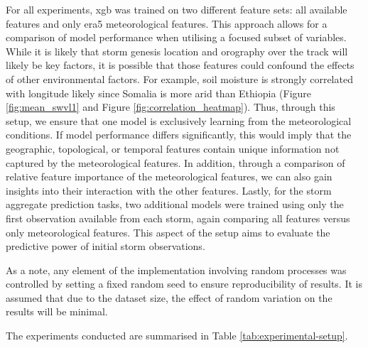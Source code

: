 For all experiments, \acrshort{xgb} was trained on two different feature sets: all available features and only \acrshort{era5} meteorological features. This approach allows for a comparison of model performance when utilising a focused subset of variables. While it is likely that storm genesis location and orography over the track will likely be key factors, it is possible that those features could confound the effects of other environmental factors. For example, soil moisture is strongly correlated with longitude likely since Somalia is more arid than Ethiopia (Figure \ref{fig:mean_swvl1} and Figure \ref{fig:correlation_heatmap}). Thus, through this setup, we ensure that one model is exclusively learning from the meteorological conditions. If model performance differs significantly, this would imply that the geographic, topological, or temporal features contain unique information not captured by the meteorological features. In addition, through a comparison of relative feature importance of the meteorological features, we can also gain insights into their interaction with the other features. Lastly, for the storm aggregate prediction tasks, two additional models were trained using only the first observation available from each storm, again comparing all features versus only meteorological features. This aspect of the setup aims to evaluate the predictive power of initial storm observations.

As a note, any element of the implementation involving random processes was controlled by setting a fixed random seed to ensure reproducibility of results. It is assumed that due to the dataset size, the effect of random variation on the results will be minimal.

The experiments conducted are summarised in Table \ref{tab:experimental-setup}.

